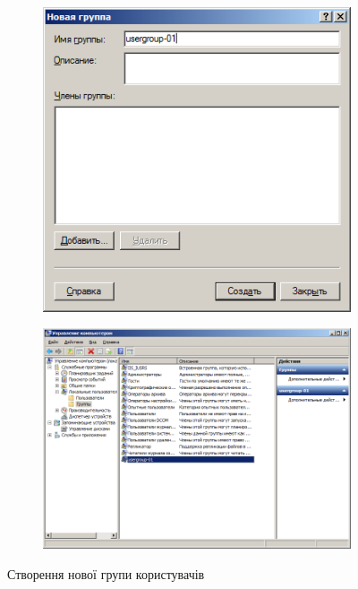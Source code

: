 \documentclass[
	a4paper,
	oneside,
	DIV = 12,
	fontsize = 13pt,
	headings = normal,
]{scrartcl}
\begin{document}
			\begin{figure}[!htbp]
				\centering
				\begin{subfigure}[t]{0.4\columnwidth}
					\centering
					\includegraphics[width = \columnwidth - 1em]{../01-solution/y03s01-pcdiag-lab-08-p06.png}
					\caption{}
					\label{subfig:group-creation-dialog}
				\end{subfigure}%
				\begin{subfigure}[t]{0.6\columnwidth}
					\centering
					\includegraphics[width = \columnwidth]{../01-solution/y03s01-pcdiag-lab-08-p07.png}
					\caption{}
					\label{subfig:group-creation-result}
				\end{subfigure}%
				\caption{Створення нової групи користувачів}
				\label{fig:group-creation}
			\end{figure}
\end{document}
